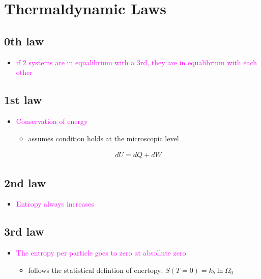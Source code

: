 

\section{Thermaldynamic Laws}

\subsection{0th law}
\begin{itemize}
    \item \textcolor{magenta}{if 2 systems are in equalibrium with a 3rd, they are in equalibrium
    with each other}
\end{itemize}


\subsection{1st law}
\begin{itemize}
    \item \textcolor{magenta}{Conservation of energy}
    \begin{itemize}
        \item assumes condition holds at the microscopic level
    \end{itemize}
    \begin{align}
        dU = dQ + dW
    \end{align}
\end{itemize}


\subsection{2nd law}
\begin{itemize}
    \item \textcolor{magenta}{Entropy always increases}
\end{itemize}


\subsection{3rd law}
\begin{itemize}
    \item \textcolor{magenta}{The entropy per particle goes to zero at absollute zero}
    \begin{itemize}
        \item follows the statistical defintion of enertopy: $S(T = 0) = k_b \ln \Omega_0$
    \end{itemize}
\end{itemize}

